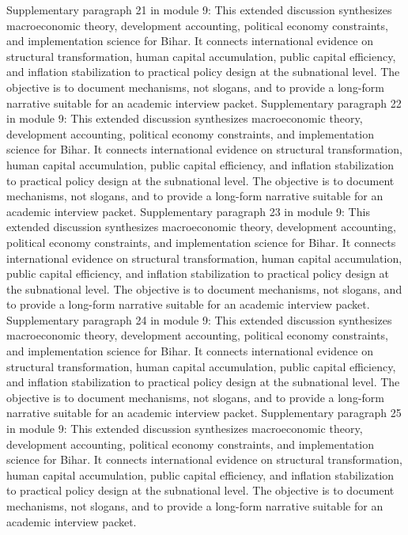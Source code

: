 \documentclass[preprint,12pt]{elsarticle}
\begin{document}
Supplementary paragraph 21 in module 9: This extended discussion synthesizes macroeconomic theory, development accounting, political economy constraints, and implementation science for Bihar. It connects international evidence on structural transformation, human capital accumulation, public capital efficiency, and inflation stabilization to practical policy design at the subnational level. The objective is to document mechanisms, not slogans, and to provide a long-form narrative suitable for an academic interview packet.
Supplementary paragraph 22 in module 9: This extended discussion synthesizes macroeconomic theory, development accounting, political economy constraints, and implementation science for Bihar. It connects international evidence on structural transformation, human capital accumulation, public capital efficiency, and inflation stabilization to practical policy design at the subnational level. The objective is to document mechanisms, not slogans, and to provide a long-form narrative suitable for an academic interview packet.
Supplementary paragraph 23 in module 9: This extended discussion synthesizes macroeconomic theory, development accounting, political economy constraints, and implementation science for Bihar. It connects international evidence on structural transformation, human capital accumulation, public capital efficiency, and inflation stabilization to practical policy design at the subnational level. The objective is to document mechanisms, not slogans, and to provide a long-form narrative suitable for an academic interview packet.
Supplementary paragraph 24 in module 9: This extended discussion synthesizes macroeconomic theory, development accounting, political economy constraints, and implementation science for Bihar. It connects international evidence on structural transformation, human capital accumulation, public capital efficiency, and inflation stabilization to practical policy design at the subnational level. The objective is to document mechanisms, not slogans, and to provide a long-form narrative suitable for an academic interview packet.
Supplementary paragraph 25 in module 9: This extended discussion synthesizes macroeconomic theory, development accounting, political economy constraints, and implementation science for Bihar. It connects international evidence on structural transformation, human capital accumulation, public capital efficiency, and inflation stabilization to practical policy design at the subnational level. The objective is to document mechanisms, not slogans, and to provide a long-form narrative suitable for an academic interview packet.
\end{document}
